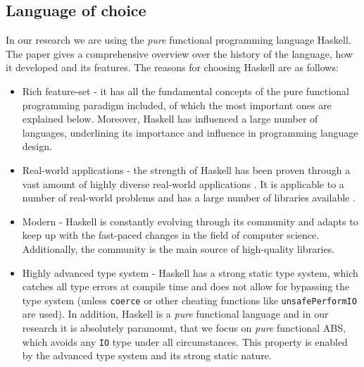 \subsection{Language of choice}
In our research we are using the \textit{pure} functional programming language Haskell. The paper \cite{hudak_history_2007} gives a comprehensive overview over the history of the language, how it developed and its features. The reasons for choosing Haskell are as follows:

\begin{itemize}
	\item Rich feature-set - it has all the fundamental concepts of the pure functional programming paradigm included, of which the most important ones are explained below. Moreover, Haskell has influenced a large number of languages, underlining its importance and influence in programming language design.
	
	\item Real-world applications - the strength of Haskell has been proven through a vast amount of highly diverse real-world applications \cite{hudak_history_2007, hudak_haskell_1994}. It is applicable to a number of real-world problems \cite{osullivan_real_2008} and has a large number of libraries available \cite{haskell_applications}.
	
	\item Modern - Haskell is constantly evolving through its community and adapts to keep up with the fast-paced changes in the field of computer science. Additionally, the community is the main source of high-quality libraries.
	
	\item Highly advanced type system - Haskell has a strong static type system, which catches all type errors at compile time and does not allow for bypassing the type system (unless \texttt{coerce} or other cheating functions like \texttt{unsafePerformIO} are used). In addition, Haskell is a \textit{pure} functional language and in our research it is absolutely paramount, that we focus on \textit{pure} functional ABS, which avoids any \texttt{IO} type under all circumstances. This property is enabled by the advanced type system and its strong static nature.
\end{itemize}

